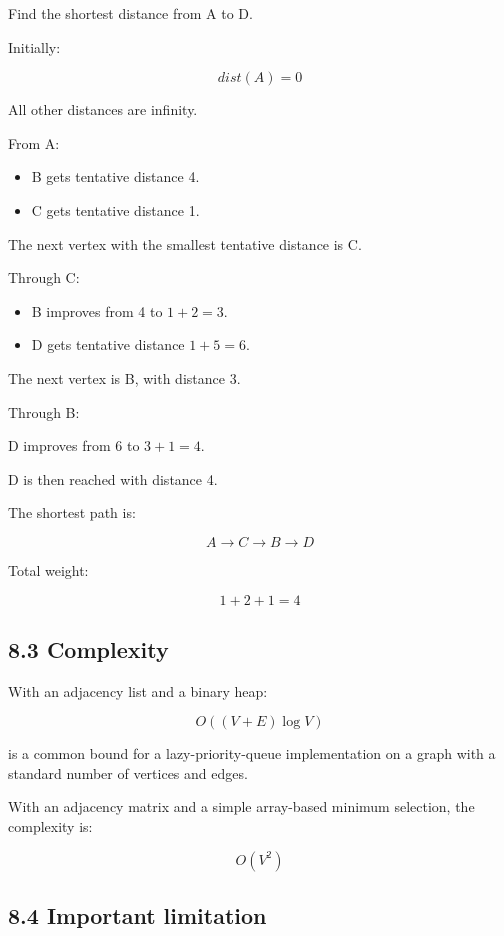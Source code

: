 Find the shortest distance from A to D.

Initially:


\[
dist(A)=0
\]


All other distances are infinity.

From A:

\begin{itemize}
    \item B gets tentative distance 4.
    \item C gets tentative distance 1.
\end{itemize}

The next vertex with the smallest tentative distance is C.

Through C:

\begin{itemize}
    \item B improves from 4 to $1+2=3$.
    \item D gets tentative distance $1+5=6$.
\end{itemize}

The next vertex is B, with distance 3.

Through B:

\- D improves from 6 to $3+1=4$.

D is then reached with distance 4.

The shortest path is:


\[
\boxed{A\rightarrow C\rightarrow B\rightarrow D}
\]


Total weight:


\[
1+2+1=\boxed{4}
\]


\subsection{8.3 Complexity}

With an adjacency list and a binary heap:


\[
\boxed{O((V+E)\log V)}
\]


is a common bound for a lazy-priority-queue implementation on a graph with a standard number of vertices and edges.

With an adjacency matrix and a simple array-based minimum selection, the complexity is:


\[
\boxed{O(V^2)}
\]


\subsection{8.4 Important limitation}

